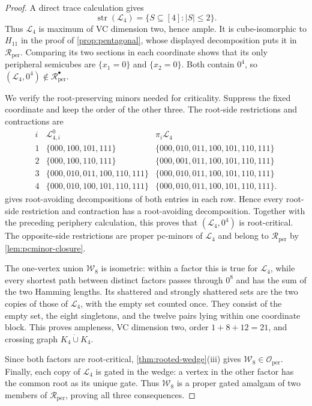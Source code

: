 \documentclass[11pt]{article}
\theoremstyle{definition}
\theoremstyle{remark}
\newcommand{\Rper}{\mathcal R_{\mathrm{per}}}
\newcommand{\Rbullet}{\mathcal R_{\mathrm{per}}^{\bullet}}
\newcommand{\Oper}{\mathcal O_{\mathrm{per}}}
\newcommand{\strc}{\operatorname{str}}
\begin{document}
\begin{proof}
A direct trace calculation gives
\[
 \strc(\mathcal L_4)=\{S\subseteq[4]:|S|\le2\}.
\]
Thus \(\mathcal L_4\) is maximum of VC dimension two, hence ample.  It is
cube-isomorphic to \(H_{11}\) in the proof of \cref{prop:pentagonal}, whose
displayed decomposition puts it in \(\Rper\).  Comparing its two sections in
each coordinate shows that its only peripheral semicubes are
\(\{x_1=0\}\) and \(\{x_2=0\}\).  Both contain \(0^4\), so
\((\mathcal L_4,0^4)\notin\Rbullet\).

We verify the root-preserving minors needed for criticality.  Suppress the
fixed coordinate and keep the order of the other three.  The root-side
restrictions and contractions are
\[
\begin{array}{c|c|c}
i&\mathcal L_{4,i}^0&\pi_i\mathcal L_4\\ \hline
1&\{000,100,101,111\}&
  \{000,010,011,100,101,110,111\}\\
2&\{000,100,110,111\}&
  \{000,001,011,100,101,110,111\}\\
3&\{000,010,011,100,110,111\}&
  \{000,010,011,100,101,110,111\}\\
4&\{000,010,100,101,110,111\}&
  \{000,010,011,100,101,110,111\}.
\end{array}
\]
 gives root-avoiding decompositions of both
entries in each row.  Hence every root-side restriction and contraction
has a root-avoiding decomposition.  Together with the preceding periphery
calculation, this proves that \((\mathcal L_4,0^4)\) is root-critical.  The
opposite-side restrictions are proper pc-minors of \(\mathcal L_4\) and
belong to \(\Rper\) by \cref{lem:pcminor-closure}.

The one-vertex union \(\mathcal W_8\) is isometric: within a factor this is
true for \(\mathcal L_4\), while every shortest path between distinct
factors passes through \(0^8\) and has the sum of the two Hamming lengths.
Its shattered and strongly shattered sets are the two copies of those of
\(\mathcal L_4\), with the empty set counted once.  They consist of the
empty set, the eight singletons, and the twelve pairs lying within one
coordinate block.  This proves ampleness, VC dimension two, order
\(1+8+12=21\), and crossing graph
\(K_4\mathbin{\dot\cup}K_4\).

Since both factors are root-critical, \cref{thm:rooted-wedge}(iii) gives
\(\mathcal W_8\in\Oper\).  Finally, each copy of \(\mathcal L_4\) is gated
in the wedge: a vertex in the other factor has the common root as its unique
gate.  Thus \(\mathcal W_8\) is a proper gated amalgam of two members of
\(\Rper\), proving all three consequences.
\end{proof}
\end{document}
